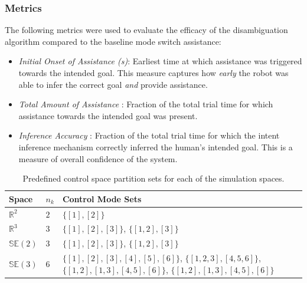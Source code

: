 \documentclass[conference]{IEEEtran}
\begin{document}
\subsubsection{Metrics}
The following metrics were used to evaluate the efficacy of the disambiguation algorithm compared to the baseline mode switch assistance:
\begin{itemize}
	\item \textit{Initial Onset of Assistance (s)}: Earliest time at which assistance  was triggered towards the intended goal. This measure captures how \textit{early} the robot was able to infer the correct goal  \textit{and} provide assistance. 
	\item \textit{Total Amount of Assistance }: Fraction of the total trial time for which assistance towards the intended goal was present.  
	\item \textit{Inference Accuracy }: Fraction of the total trial time for which the intent inference mechanism correctly inferred the human's intended goal. This is a measure of overall confidence of the system. 
\end{itemize}
\begin{table}[t]
	\centering
	\begin{tabular}{|p{1cm}|p{0.5cm}|p{3cm}|}
		\hline
		\textbf{Space} & $n_k$ &\textbf{Control Mode Sets}  \\ \hline
		$\mathbb{R}^2$ & $2$ & $\{[1],[2]\}$ \\ \hline
		$\mathbb{R}^3$ & $3$ & $\{[1],[2], [3]\}$, $\{[1,2], [3]\}$ \\ \hline
		$\mathbb{SE}(2)$ & $3$ &  $\{[1],[2],[3]\}$, $\{[1,2], [3]\}$ \\ \hline
		$\mathbb{SE}(3)$ & $6$ & $\{[1],[2],[3],[4],[5],[6]\}$, $\{[1,2,3],  [4,5,6]\}$, $\{[1,2], [1,3], [4,5], [6]\}$, $\{[1,2], [1,3], [4,5], [6]\}$ \\ \hline
	\end{tabular}
	\vspace{.2cm}
	\caption{Predefined control space partition sets for each of the simulation spaces.} 
	\label{tbl:cmp}
	\vspace{-.5cm}
\end{table}
\end{document}
